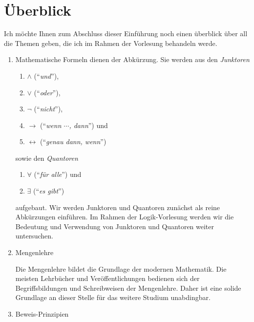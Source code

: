 
\section{\"{U}berblick}
Ich m\"{o}chte Ihnen zum Abschluss dieser Einf\"{u}hrung noch einen \"{u}berblick \"{u}ber all die Themen geben, die
ich im Rahmen der Vorlesung behandeln werde.  
\begin{enumerate}
\item Mathematische Formeln dienen der Abk\"{u}rzung.  Sie werden aus den \emph{Junktoren} 
      \begin{enumerate}
      \item $\wedge$ (``\emph{und}''),
      \item $\vee$ (``\emph{oder}''),
      \item $\neg$ (``\emph{nicht}''),
      \item $\rightarrow$ (``\emph{wenn $\cdots$, dann}'') und
      \item $\leftrightarrow$ (``\emph{genau dann, wenn}'') 
      \end{enumerate}
      sowie den \emph{Quantoren}
      \begin{enumerate}
      \item $\forall$ (``\emph{f\"{u}r alle}'') und
      \item $\exists$ (``\emph{es gibt}'') 
      \end{enumerate}
      aufgebaut.
      Wir werden  Junktoren und Quantoren zun\"{a}chst
      als reine Abk\"{u}rzungen einf\"{u}hren.  Im Rahmen der Logik-Vorlesung werden wir die Bedeutung
      und Verwendung von Junktoren und Quantoren weiter untersuchen.
\item Mengenlehre

      Die Mengenlehre bildet die Grundlage der modernen Mathematik.  Die meisten Lehrb\"{u}cher und
      Ver\"{o}ffentlichungen bedienen sich der Begriffsbildungen und Schreibweisen der Mengenlehre.
      Daher ist eine solide Grundlage an dieser Stelle f\"{u}r das weitere Studium unabdingbar.
\item Beweis-Prinzipien


\end{enumerate}
